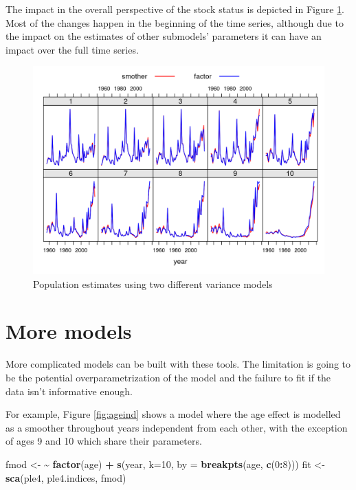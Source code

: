 \documentclass[
]{book}
\newenvironment{Shaded}{\begin{snugshade}}{\end{snugshade}}
\newcommand{\AttributeTok}[1]{\textcolor[rgb]{0.13,0.29,0.53}{#1}}
\newcommand{\DecValTok}[1]{\textcolor[rgb]{0.00,0.00,0.81}{#1}}
\newcommand{\ErrorTok}[1]{\textcolor[rgb]{0.64,0.00,0.00}{\textbf{#1}}}
\newcommand{\FunctionTok}[1]{\textcolor[rgb]{0.13,0.29,0.53}{\textbf{#1}}}
\newcommand{\NormalTok}[1]{#1}
\newcommand{\OtherTok}[1]{\textcolor[rgb]{0.56,0.35,0.01}{#1}}
\newcommand{\SpecialCharTok}[1]{\textcolor[rgb]{0.81,0.36,0.00}{\textbf{#1}}}
\begin{document}
The impact in the overall perspective of the stock status is depicted in Figure \ref{fig:n1modimpact}. Most of the changes happen in the beginning of the time series, although due to the impact on the estimates of other submodels' parameters it can have an impact over the full time series.

\begin{figure}
\centering
\includegraphics{_bookdown_files/_main_files/figure-html/n1modimpact-1.png}
\caption{\label{fig:n1modimpact}Population estimates using two different variance models}
\end{figure}

\hypertarget{more-models}{%
\section{More models}\label{more-models}}

More complicated models can be built with these tools. The limitation is going to be the potential overparametrization of the model and the failure to fit if the data isn't informative enough.

For example, Figure \ref{fig:ageind} shows a model where the age effect is modelled as a smoother throughout years independent from each other, with the exception of ages 9 and 10 which share their parameters.

\begin{Shaded}
\begin{Highlighting}[]
\NormalTok{fmod }\OtherTok{\textless{}{-}} \ErrorTok{\textasciitilde{}} \FunctionTok{factor}\NormalTok{(age) }\SpecialCharTok{+} \FunctionTok{s}\NormalTok{(year, }\AttributeTok{k=}\DecValTok{10}\NormalTok{, }\AttributeTok{by =} \FunctionTok{breakpts}\NormalTok{(age, }\FunctionTok{c}\NormalTok{(}\DecValTok{0}\SpecialCharTok{:}\DecValTok{8}\NormalTok{)))}
\NormalTok{fit }\OtherTok{\textless{}{-}} \FunctionTok{sca}\NormalTok{(ple4, ple4.indices, fmod)}
\end{Highlighting}
\end{Shaded}
\end{document}
